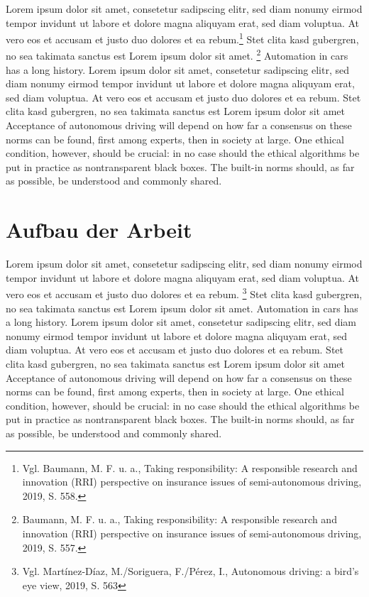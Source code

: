Lorem ipsum dolor sit amet, consetetur sadipscing elitr, sed diam nonumy eirmod tempor invidunt ut labore et dolore magna aliquyam erat, sed diam voluptua. 
At vero eos et accusam et justo duo dolores et ea rebum.\footnote{Vgl. Baumann, M. F. u. a., Taking responsibility: A responsible research and innovation (RRI) perspective on insurance issues of semi-autonomous driving, 2019, S. 558.} 
Stet clita kasd gubergren, no sea takimata sanctus est Lorem ipsum dolor sit amet. \footnote{Baumann, M. F. u. a., Taking responsibility: A responsible research and innovation (RRI) perspective on insurance issues of semi-autonomous driving, 2019, S. 557.}
Automation in cars has a long history.  Lorem ipsum dolor sit amet, consetetur sadipscing elitr, sed diam nonumy eirmod tempor invidunt ut labore et dolore magna aliquyam erat, sed diam voluptua. 
At vero eos et accusam et justo duo dolores et ea rebum. 
Stet clita kasd gubergren, no sea takimata sanctus est Lorem ipsum dolor sit amet Acceptance of autonomous driving will depend on how far a consensus on these norms can be found, first among experts, then in society at large. 
One ethical condition, however, should be crucial: in no case should the ethical algorithms be put in practice as nontransparent black boxes. 
The built-in norms should, as far as possible, be understood and commonly shared.


\section{Aufbau der Arbeit}

Lorem ipsum dolor sit amet, consetetur sadipscing elitr, sed diam nonumy eirmod tempor invidunt ut labore et dolore magna aliquyam erat, sed diam voluptua. 
At vero eos et accusam et justo duo dolores et ea rebum. \footnote{Vgl. Martínez-Díaz, M./Soriguera, F./Pérez, I., Autonomous driving: a bird's eye view, 2019, S. 563}
Stet clita kasd gubergren, no sea takimata sanctus est Lorem ipsum dolor sit amet. 
Automation in cars has a long history.  Lorem ipsum dolor sit amet, consetetur sadipscing elitr, sed diam nonumy eirmod tempor invidunt ut labore et dolore magna aliquyam erat, sed diam voluptua. 
At vero eos et accusam et justo duo dolores et ea rebum. 
Stet clita kasd gubergren, no sea takimata sanctus est Lorem ipsum dolor sit amet Acceptance of autonomous driving will depend on how far a consensus on these norms can be found, first among experts, then in society at large. 
One ethical condition, however, should be crucial: in no case should the ethical algorithms be put in practice as nontransparent black boxes. 
The built-in norms should, as far as possible, be understood and commonly shared.